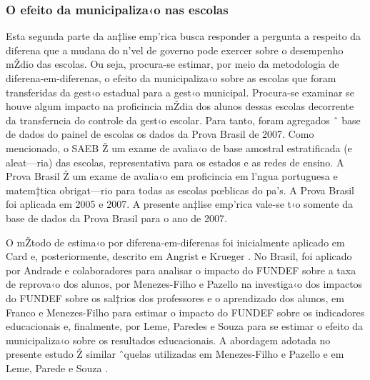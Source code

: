\documentclass[a4paper, 12pt]{article}
\begin{document}
\subsubsection{O efeito da municipaliza‹o nas escolas}

Esta segunda parte da an‡lise emp’rica busca responder a pergunta a respeito da diferena que a mudana do n’vel de governo pode exercer sobre o desempenho mŽdio das escolas. Ou seja,  procura-se  estimar, por meio da metodologia de diferena-em-diferenas, o efeito da municipaliza‹o sobre as escolas que foram transferidas da gest‹o estadual para a gest‹o municipal. Procura-se examinar se houve algum impacto na proficincia mŽdia dos alunos dessas escolas decorrente da transferncia do controle da gest‹o escolar. Para tanto, foram agregados ˆ base de dados do painel de escolas os dados da Prova Brasil de 2007. Como mencionado, o SAEB Ž um exame de avalia‹o de base amostral estratificada (e aleat—ria) das escolas, representativa para os estados e as redes de ensino. A Prova Brasil Ž um exame de avalia‹o em proficincia em l’ngua portuguesa e matem‡tica obrigat—rio para todas as escolas pœblicas do pa’s. A Prova Brasil foi aplicada em 2005 e 2007. A presente an‡lise emp’rica vale-se t‹o somente da base de dados da Prova Brasil para o ano de 2007. 

O mŽtodo de estima‹o por diferena-em-diferenas foi inicialmente aplicado em Card \citeyear{card_impact_1990} e, posteriormente, descrito em Angrist e Krueger \citeyear{angrist_empirical_1999}. No Brasil, foi aplicado por Andrade e colaboradores \citeyear{andrade_freerider_2008} para analisar o impacto do FUNDEF sobre a taxa de reprova‹o dos alunos, por Menezes-Filho e Pazello \citeyear{menezes-filho_teachers_2007} na investiga‹o dos impactos do FUNDEF sobre os sal‡rios dos professores e o aprendizado dos alunos, em Franco e Menezes-Filho \citeyear{franco_2010_impactos} para estimar o impacto do FUNDEF sobre os indicadores educacionais e, finalmente,  por Leme, Paredes e Souza \citeyear{leme_municipalizacao_2009} para se estimar o efeito da municipaliza‹o sobre os resultados educacionais. A abordagem adotada no presente estudo Ž similar ˆquelas utilizadas em Menezes-Filho e Pazello \citeyear{menezes-filho_teachers_2007} e em Leme, Parede e Souza \citeyear{leme_municipalizacao_2009}. 
\end{document}
